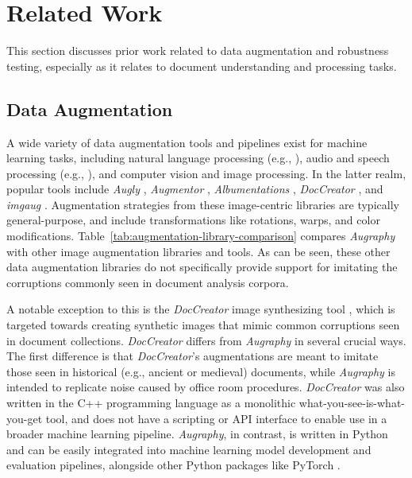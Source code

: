 \documentclass[runningheads]{llncs}
\begin{document}
\section{Related Work}


This section discusses prior work related to data augmentation and robustness testing, especially as it relates to document understanding and processing tasks.

\subsection{Data Augmentation}
A wide variety of data augmentation tools and pipelines exist for machine learning tasks, including  natural language processing (e.g., \cite{feng-etal-2021-survey,fadaee-etal-2017-data,wei-zou-2019-eda}), audio and speech processing (e.g., \cite{ko15_interspeech,audiogmenter,audio-framework}), and computer vision and image processing.
In the latter realm, popular tools include \emph{Augly} \cite{Papakipos2022-gq-augly}, \emph{Augmentor} \cite{augmentor}, \emph{Albumentations} \cite{ref_albumentations}, \emph{DocCreator} \cite{ref_DocCreator}, and \emph{imgaug} \cite{ref_imgaug}.
Augmentation strategies from these image-centric libraries are typically general-purpose, and include transformations like rotations, warps, and color modifications.
Table~\ref{tab:augmentation-library-comparison} compares \emph{Augraphy} with other image augmentation libraries and tools.
As can be seen, these other data augmentation libraries do not specifically provide support for imitating the corruptions commonly seen in document analysis corpora.

A notable exception to this is the \emph{DocCreator} image synthesizing tool \cite{ref_DocCreator}, which is targeted towards creating synthetic images that mimic common corruptions seen in document collections.
\emph{DocCreator} differs from \emph{Augraphy} in several crucial ways.
The first difference is that \emph{DocCreator}'s augmentations are meant to imitate those seen in historical (e.g., ancient or medieval) documents, while \emph{Augraphy} is intended to replicate noise caused by office room procedures.
\emph{DocCreator} was also written in the C++ programming language as a monolithic what-you-see-is-what-you-get tool, and does not have a scripting or API interface to enable use in a broader machine learning pipeline.
\emph{Augraphy}, in contrast, is written in Python and can be easily integrated into machine learning model development and evaluation pipelines, alongside other Python packages like PyTorch \cite{ref_pytorch}.
\end{document}
